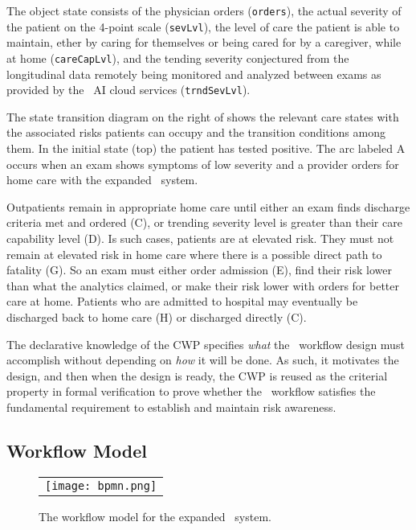The object state consists of the physician orders (\texttt{orders}), the actual severity of the patient on the 4-point scale (\texttt{sevLvl}), the level of care the patient is able to maintain, ether by caring for themselves or being cared for by a caregiver, while at home (\texttt{careCapLvl}), and the tending severity conjectured from the longitudinal data remotely being monitored and analyzed between exams as provided by the \phware\ AI cloud services (\texttt{trndSevLvl}).

The state transition diagram on the right of  shows the relevant care states with the associated risks patients can occupy and the transition conditions among them. In the initial state (top) the patient has tested positive. The arc labeled A occurs when an exam shows symptoms of low severity and a provider orders for home care with the expanded \phware\ system. 

Outpatients remain in appropriate home care until either an exam finds discharge criteria met and ordered (C), or trending severity level is greater than their care capability level (D). Is such cases, patients are at elevated risk. They must not remain at elevated risk in home care where there is a possible direct path to fatality (G). So an exam must either order admission (E), find their risk lower than what the analytics claimed, or make their risk lower with orders for better care at home. Patients who are admitted to hospital may eventually be discharged back to home care (H) or discharged directly (C). 

The declarative knowledge of the CWP specifies \emph{what} the \phware\ workflow design must accomplish without depending on \emph{how} it will be done. As such, it motivates the design, and then when the design is ready, the CWP is reused as the criterial property in formal verification to prove whether the \phware\ workflow satisfies the fundamental requirement to establish and maintain risk awareness. 

\subsection{Workflow Model}
\begin{figure*}
  \begin{center}
    \begin{tabular}{c}
      \texttt{[image: bpmn.png]}
    \end{tabular}
  \end{center}
\caption{The workflow model for the expanded \phware\ system.}
\label{fig:bpmn}
\end{figure*}

